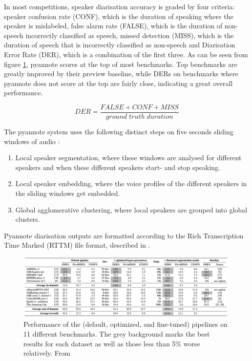 \documentclass[twoside]{uva-inf-bachelor-thesis}
\begin{document}
In most competitions, speaker diarisation accuracy is graded by four criteria: speaker confusion rate (CONF), which is the duration of speaking where the speaker is mislabeled, false alarm rate (FALSE), which is the duration of non-speech incorrectly classified as speech, missed detection (MISS), which is the duration of speech that is incorrectly classified as non-speech and Diarisation Error Rate (DER), which is a combination of the first three. As can be seen from figure \ref{fig:pyanres}, pyannote scores at the top of most benchmarks. Top benchmarks are greatly improved by their preview baseline, while DERs on benchmarks where pyannote does not score at the top are fairly close, indicating a great overall performance. \cite{bredin2023pyannote}

\begin{equation}
    DER = \frac{FALSE + CONF + MISS}{ground \; truth \; duration}
\end{equation}

The pyannote system uses the following distinct steps on five seconds sliding windows of audio \cite{bredin2023pyannote}: 
\begin{enumerate}
    \item Local speaker segmentation, where these windows are analysed for different speakers and when these different speakers start- and stop speaking.
    \item Local speaker embedding, where the voice profiles of the different speakers in the sliding windows get embedded.
    \item Global agglomerative clustering, where local speakers are grouped into global clusters. 
\end{enumerate}

Pyannote diarisation outputs are formatted according to the Rich Transcription Time Marked (RTTM) file format, described in \cite{ryant2018first}.

\begin{figure}
    \centering
    \includegraphics[width=0.99\textwidth]{images/pyanresults2.png}
    \caption{Performance of the (default, optimized, and fine-tuned) pipelines on 11 different benchmarks. The grey background marks the best results for each dataset as well as those less than 5\% worse relatively. From \cite{bredin2023pyannote}}
    \label{fig:pyanres}
\end{figure}
\end{document}
